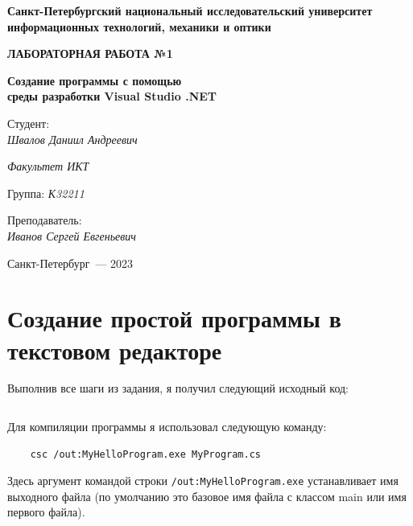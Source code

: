 \documentclass[a4paper,14pt]{extarticle}
\numberwithin{figure}{section}
\begin{document}
\begin{titlepage}
    \vspace{0pt plus2fill}
    \noindent

    \vspace{0pt plus6fill}
    \begin{center}
        \textbf{\large{Санкт-Петербургский национальный исследовательский университет информационных
                технологий, механики и оптики}}

        \vspace{0pt plus2fill}
        \textbf{\Large{ЛАБОРАТОРНАЯ РАБОТА №1}}

        \vspace{0pt plus2fill}
        \textbf{\large{Создание программы с помощью \\ среды разработки Visual Studio .NET}}
    \end{center}

    \vspace{0pt plus8fill}
    \begin{flushright}
        Студент: \\
        \textit{Швалов Даниил Андреевич}

        \textit{Факультет ИКТ}

        Группа: \textit{К32211}

        Преподаватель: \\
        \textit{Иванов Сергей Евгеньевич}
    \end{flushright}

    \vspace{0pt plus4fill}
    \begin{center}
        {Санкт-Петербург~--- 2023}
    \end{center}
\end{titlepage}

\section{Создание простой программы в текстовом редакторе}

Выполнив все шаги из задания, я получил следующий исходный код:
\inputminted{csharp}{../TextEditor/MyProgram.cs}

Для компиляции программы я использовал следующую команду:
\begin{verbatim}
    csc /out:MyHelloProgram.exe MyProgram.cs
\end{verbatim}

Здесь аргумент командой строки \texttt{/out:MyHelloProgram.exe} устанавливает имя выходного файла (по умолчанию это базовое имя файла с классом main или имя первого файла).
\end{document}
